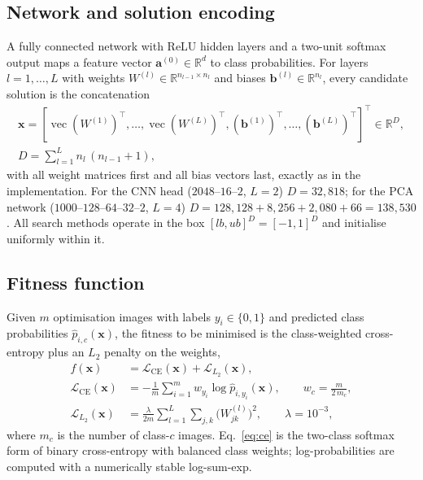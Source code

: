 \documentclass[preprint,12pt]{elsarticle}
\newcommand{\R}{\mathbb{R}}
\newcommand{\vecop}{\operatorname{vec}}
\begin{document}
\subsection{Network and solution encoding}
A fully connected network with ReLU hidden layers and a two-unit softmax output maps a feature vector $\mathbf{a}^{(0)}\in\R^{d}$ to class probabilities. For layers $l=1,\dots,L$ with weights $W^{(l)}\in\R^{n_{l-1}\times n_l}$ and biases $\mathbf{b}^{(l)}\in\R^{n_l}$, every candidate solution is the concatenation
\begin{equation}
\begin{gathered}
\mathbf{x}=\left[\vecop(W^{(1)})^{\top},\dots,\vecop(W^{(L)})^{\top},(\mathbf{b}^{(1)})^{\top},\dots,(\mathbf{b}^{(L)})^{\top}\right]^{\top}\in\R^{D},\\
D=\sum_{l=1}^{L}n_l\,(n_{l-1}+1),
\end{gathered}
\label{eq:encoding}
\end{equation}
with all weight matrices first and all bias vectors last, exactly as in the implementation. For the CNN head ($2048$--$16$--$2$, $L=2$) $D=32{,}818$; for the PCA network ($1000$--$128$--$64$--$32$--$2$, $L=4$) $D=128{,}128+8{,}256+2{,}080+66=138{,}530$. All search methods operate in the box $[lb,ub]^D=[-1,1]^D$ and initialise uniformly within it.

\subsection{Fitness function}
Given $m$ optimisation images with labels $y_i\in\{0,1\}$ and predicted class probabilities $\hat p_{i,c}(\mathbf{x})$, the fitness to be minimised is the class-weighted cross-entropy plus an $L_2$ penalty on the weights,
\begin{align}
f(\mathbf{x}) &= \mathcal{L}_{\mathrm{CE}}(\mathbf{x})+\mathcal{L}_{L_2}(\mathbf{x}),\label{eq:fitness}\\
\mathcal{L}_{\mathrm{CE}}(\mathbf{x}) &= -\frac{1}{m}\sum_{i=1}^{m} w_{y_i}\log \hat p_{i,y_i}(\mathbf{x}),\qquad w_c=\frac{m}{2\,m_c},\label{eq:ce}\\
\mathcal{L}_{L_2}(\mathbf{x}) &= \frac{\lambda}{2m}\sum_{l=1}^{L}\sum_{j,k}\bigl(W^{(l)}_{jk}\bigr)^2,\qquad \lambda=10^{-3},\label{eq:l2}
\end{align}
where $m_c$ is the number of class-$c$ images. Eq.~\eqref{eq:ce} is the two-class softmax form of binary cross-entropy with balanced class weights; log-probabilities are computed with a numerically stable log-sum-exp.
\end{document}
